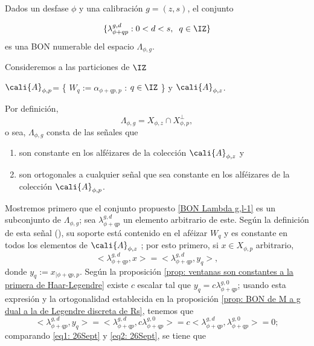 \begin{teo} 
\label{teo:BON para Y z,p,l}
Dados un desfase $\phi$ y una calibración $g=(z,s)$, el conjunto

\begin{equation}\label{BON Lambda g,l-1}
\{ \lambda^{g,d}_{\phi+qp} : 0<d<s, \hspace{0.2cm} q \in \IZ  \}
\end{equation}
es una BON numerable del espacio $\Lambda_{\phi,g}$.
\end{teo}
\begin{dem} 
Consideremos a las particiones de $\IZ$
\begin{center}
$\cali{A}_{\phi, p}$= \{
$W_{q}:=  \alpha_{\phi+qp, p}$ : $ q \in \IZ$ \}
y $\cali{A}_{\phi, z}$.
\end{center}
Por definición,
\[
 \Lambda_{\phi, g}= X_{\phi, z} \cap X_{\phi, p}^{\perp},
\]
o sea, $\Lambda_{\phi, g}$
consta de las señales que
\begin{enumerate}
\item son constante en los alféizares de la colección $\cali{A}_{\phi, z}$ y
\item son ortogonales
a cualquier señal que sea constante en 
los alféizares de la colección $\cali{A}_{\phi, p}$.
\end{enumerate}

Mostremos primero que el conjunto propuesto
\eqref{BON Lambda g,l-1} es un subconjunto de $\Lambda_{\phi, g}$;
sea $\lambda^{g,d}_{\phi+qp}$ un elemento arbitrario de este.
Según la definición de esta señal (),
su soporte está contenido
en el aféizar $W_{q}$ y
es constante en todos los elementos
de $\cali{A}_{\phi, z}$ ; por esto primero, si 
$x \in X_{\phi, p} $ arbitrario, 
\begin{equation}
\label{eq1: 26Sept}
< \lambda^{g,d}_{\phi+qp} , x > = 
< \lambda^{g,d}_{\phi+qp} , y_{q} >,
\end{equation}
donde $y_{q}:= x_{|\phi+qp, p}$. 
Según la proposición
\ref{prop: ventanas son constantes a la primera de Haar-Legendre}
existe $c$ escalar tal 
que $y_{q}=c \lambda_{\phi+qp}^{g,0}$; usando
esta expresión y la
ortogonalidad establecida en la proposición
\ref{prop: BON de M a g dual a la de Legendre discreta de Rs}, tenemos que
\begin{equation}
\label{eq2: 26Sept}
< \lambda^{g,d}_{\phi+qp} , y_{q} >=
< \lambda^{g,d}_{\phi+qp} , c \lambda_{\phi+qp}^{g,0}>
= c < \lambda^{g,d}_{\phi+qp} , \lambda^{g,0}_{\phi+qp} >=0;
\end{equation}
comparando \eqref{eq1: 26Sept} y \eqref{eq2: 26Sept},
se tiene que


\end{dem}
